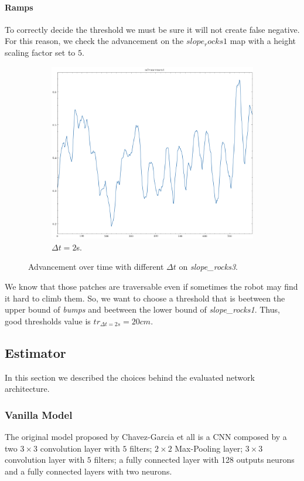 \documentclass[../document.tex]{subfiles}
\begin{document}
\paragraph{Ramps}
To correctly decide the threshold we must be sure it will not create false negative. For this reason, we check the advancement on the $slope_rocks1$ map with a height scaling factor set to $5$.
\begin{figure}[H]
    \centering
    \begin{subfigure}[b]{0.45\textwidth}
        \includegraphics[width=\linewidth]{../img/3/find_tr/100-slope_rocks1}
        \caption{$\Delta t = 2$s.}
    \end{subfigure}
    
    \caption{Advancement over time with different $\Delta t$ on \emph{slope\_rocks3}.}
\end{figure}
We know that those patches are traversable even if sometimes the robot may find it hard to climb them. So, we want to choose a threshold that is beetween the upper bound of \emph{bumps} and beetween the lower bound of \emph{slope\_rocks1}. Thus, good thresholds value is $tr_{\Delta t = 2s} = 20cm$.

\subsection{Estimator}
\label{sec: estimator}
In this section we described the choices behind the evaluated network architecture.
\subsubsection{Vanilla Model}
The original model proposed by Chavez-Garcia et all \cite{omar2018traversability} is a CNN composed by a two $3 \times 3$ convolution layer with $5$ filters; $2 \times 2$ Max-Pooling layer; $3 \times 3$ convolution layer with $5$ filters; a fully connected layer with 128 outputs neurons and a fully connected layers with two neurons. 
\end{document}
